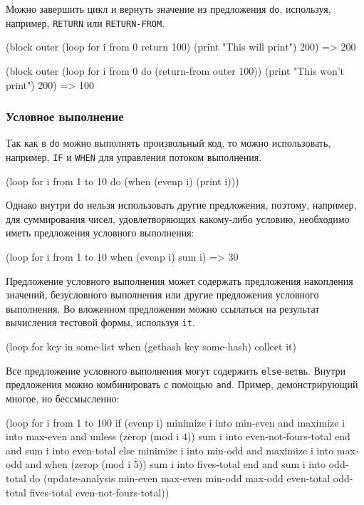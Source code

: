 Можно завершить цикл и вернуть значение из предложения \lstinline{do}, используя, например, \lstinline{RETURN} или \lstinline{RETURN-FROM}.
\begin{cllst}{}{}
(block outer
    (loop for i from 0 return 100)
    (print "This will print")
    200) => 200

(block outer
    (loop for i from 0 do (return-from outer 100))
    (print "This won't print")
    200) => 100
\end{cllst}

\subsubsection{Условное выполнение}
Так как в \lstinline{do} можно выполнять произвольный код, то можно использовать, например, \lstinline{IF} и \lstinline{WHEN} для управления потоком выполнения.
\begin{cllst}{}{}
(loop for i from 1 to 10 do (when (evenp i) (print i)))
\end{cllst}

Однако внутри \lstinline{do} нельзя использовать другие предложения, поэтому, например, для суммирования чисел, удовлетворяющих какому-либо условию, необходимо иметь предложения условного выполнения:
\begin{cllst}{}{}
(loop for i from 1 to 10 when (evenp i) sum i) => 30
\end{cllst}

Предложение условного выполнения может содержать предложения накопления значений, безусловного выполнения или другие предложения условного выполнения. Во вложенном предложении можно ссылаться на результат вычисления тестовой формы, используя \lstinline{it}.
\begin{cllst}{}{}
(loop for key in some-list when (gethash key some-hash) collect it)
\end{cllst}

Все предложение условного выполнения могут содержить \lstinline{else}-ветвь. Внутри предложения можно комбинировать с помощью \lstinline{and}. Пример, демонстрирующий многое, но бессмысленно:
\begin{cllst}{}{}
(loop for i from 1 to 100
   if (evenp i)
     minimize i into min-even and 
     maximize i into max-even and
     unless (zerop (mod i 4))
       sum i into even-not-fours-total
     end
     and sum i into even-total
   else
     minimize i into min-odd and
     maximize i into max-odd and
     when (zerop (mod i 5)) 
       sum i into fives-total
     end
   and sum i into odd-total
   do (update-analysis min-even
                       max-even
                       min-odd
                       max-odd
                       even-total
                       odd-total
                       fives-total
                       even-not-fours-total))
\end{cllst}

